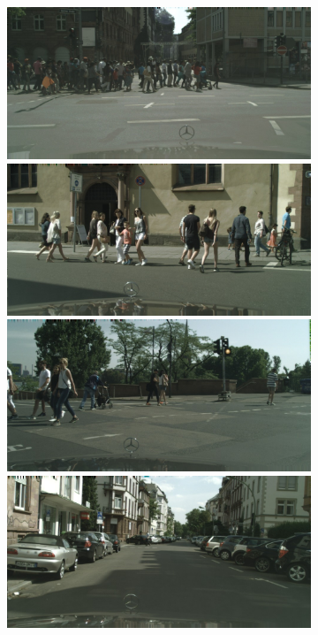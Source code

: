 \begin{figure}[p]
{{\begin{subfigure}[t]{0.24\linewidth}
\begin{center}
		\includegraphics[width=\linewidth,trim={0px 60px 0 0px},clip]{results/segnet_149_output_0.jpg}
		\includegraphics[width=\linewidth,trim={0px 60px 0 0px},clip]{results/segnet_128_output_0.jpg}
		\includegraphics[width=\linewidth,trim={0px 60px 0 0px},clip]{results/segnet_114_output_0.jpg}
		\includegraphics[width=\linewidth,trim={0px 60px 0 0px},clip]{results/segnet_86_output_0.jpg}

\end{center}
\end{subfigure}}}
\end{figure}
